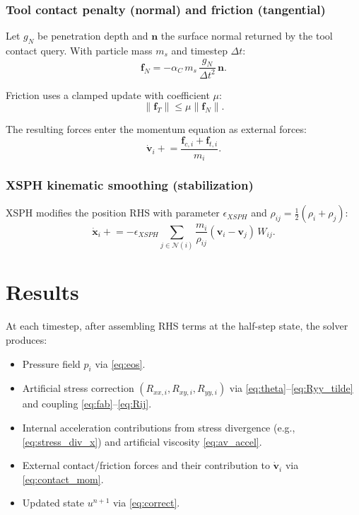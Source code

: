 \documentclass[11pt]{article}
\begin{document}
\subsubsection{Tool contact penalty (normal) and friction (tangential)}

Let $g_N$ be penetration depth and $\bm{n}$ the surface normal returned by the tool contact query. With particle mass $m_s$ and timestep $\Delta t$:
\begin{equation}
\bm{f}_N = -\alpha_C\,m_s\,\frac{g_N}{\Delta t^2}\,\bm{n}.
\label{eq:contact_penalty}
\end{equation}

Friction uses a clamped update with coefficient $\mu$:
\begin{equation}
\|\bm{f}_T\| \le \mu \|\bm{f}_N\|.
\label{eq:coulomb}
\end{equation}

The resulting forces enter the momentum equation as external forces:
\begin{equation}
\dot{\bm{v}}_i \mathrel{+}= \frac{\bm{f}_{c,i}+\bm{f}_{t,i}}{m_i}.
\label{eq:contact_mom}
\end{equation}

\subsubsection{XSPH kinematic smoothing (stabilization)}

XSPH modifies the position RHS with parameter $\epsilon_{XSPH}$ and $\rho_{ij}=\frac12(\rho_i+\rho_j)$:
\begin{equation}
\dot{\bm{x}}_i \mathrel{+}= -\epsilon_{XSPH}\sum_{j\in\mathcal{N}(i)} \frac{m_i}{\rho_{ij}}(\bm{v}_i-\bm{v}_j)\,W_{ij}.
\label{eq:xsph}
\end{equation}

\section{Results}

At each timestep, after assembling RHS terms at the half-step state, the solver produces:

\begin{itemize}
  \item Pressure field $p_i$ via \eqref{eq:eos}.
  \item Artificial stress correction $(R_{xx,i},R_{xy,i},R_{yy,i})$ via \eqref{eq:theta}--\eqref{eq:Ryy_tilde} and coupling \eqref{eq:fab}--\eqref{eq:Rij}.
  \item Internal acceleration contributions from stress divergence (e.g., \eqref{eq:stress_div_x}) and artificial viscosity \eqref{eq:av_accel}.
  \item External contact/friction forces and their contribution to $\dot{\bm{v}}_i$ via \eqref{eq:contact_mom}.
  \item Updated state $u^{n+1}$ via \eqref{eq:correct}.
\end{itemize}
\end{document}
